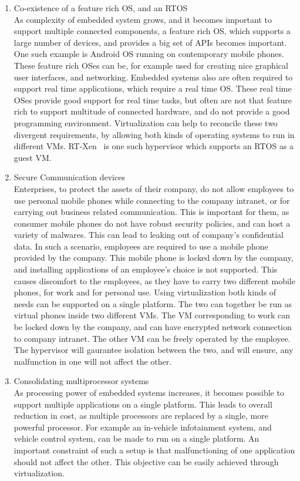 \documentclass[seminar,twoside]{iitbreport}
\begin{document}
\begin{enumerate}\label{moti}
 \item Co-existence of a feature rich OS, and an RTOS\\
 As complexity of embedded system grows, and it becomes important to support multiple connected components, a feature rich OS, which supports a large number of devices, and 
 provides a big set of APIs becomes important. One such example is Android OS running on contemporary mobile phones. These feature rich OSes can be, for example used for creating
  nice graphical user interfaces, and networking. 
 Embedded systems also are often required to support real time applications, which require a real time OS. These real time OSes provide good support for real time tasks, but often
  are not that feature rich to support multitude of connected hardware, and do not provide a good programming environment. Virtualization can help to reconcile these two divergent requirements, 
  by allowing both kinds of operating systems to run in different VMs. RT-Xen~\cite{6064510} is one such hypervisor which supports an RTOS as a guest VM.
  \item Secure Communication devices\\
  Enterprises, to protect the assets of their company, do not allow employees to use personal mobile phones while connecting to the company intranet, or for carrying out
  business related communication. This is important for them, as consumer mobile phones do not have robust security policies, and can host a variety of malwares. This can lead to
   leaking out of company's confidential data.
    In such a scenario, employees are required to use a mobile phone provided by the company. This mobile phone is locked down by the company, and installing applications of
     an employee's choice is not supported. This causes discomfort to the employees, as they have to carry two different mobile phones, for work and for personal use. 
     Using virtualization both kinds of needs can be supported on a single platform. The two can together be run as virtual phones inside two different VMs. The VM corresponding to
     work can be locked down by the company, and can have encrypted network connection to company intranet. The other VM can be freely operated by the employee.
     The hypervisor will gaurantee isolation between the two, and will ensure, any malfunction in one will not affect the other.
     \item Consolidating multiprocessor systems\\
     As processing power of embedded systems increases, it becomes possible to support multiple applications on a single platform. This leads to overall reduction in cost, as multiple 
     processors are replaced by a single, more powerful processor. For example an in-vehicle infotainment system, and 
     vehicle control system, can be made to run on a single platform. An important constraint of such a setup is that malfunctioning of one application should not 
     affect the other. This objective can be easily achieved through virtualization.
\end{enumerate}
\end{document}
